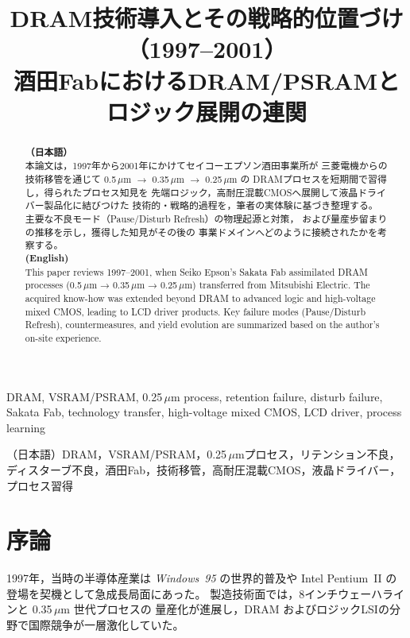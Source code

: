 \documentclass[conference]{IEEEtran}
\title{DRAM技術導入とその戦略的位置づけ（1997--2001）\\
\large 酒田FabにおけるDRAM/PSRAMとロジック展開の連関}
\author{%
  \IEEEauthorblockN{三溝 真一 (Shinichi Samizo)}%
  \IEEEauthorblockA{独立系半導体研究者（元セイコーエプソン）\\%
  Independent Semiconductor Researcher (ex-Seiko Epson)\\%
  Email: \href{mailto:shin3t72@gmail.com}{shin3t72@gmail.com}\\%
  GitHub: \url{https://github.com/Samizo-AITL}}%
}
\begin{document}
\maketitle

\begin{abstract}
\textbf{（日本語）}\\
本論文は，1997年から2001年にかけてセイコーエプソン酒田事業所が
三菱電機からの技術移管を通じて \mbox{0.5\,$\mu$m} $\rightarrow$ \mbox{0.35\,$\mu$m} $\rightarrow$ \mbox{0.25\,$\mu$m} の
DRAMプロセスを短期間で習得し，得られたプロセス知見を
先端ロジック，高耐圧混載CMOSへ展開して液晶ドライバー製品化に結びつけた
技術的・戦略的過程を，筆者の実体験に基づき整理する。
主要な不良モード（Pause/Disturb Refresh）の物理起源と対策，
および量産歩留まりの推移を示し，獲得した知見がその後の
事業ドメインへどのように接続されたかを考察する。\\[1ex]

\textbf{(English)}\\
This paper reviews 1997–2001, when Seiko Epson’s Sakata Fab
assimilated DRAM processes (0.5\,$\mu$m → 0.35\,$\mu$m → 0.25\,$\mu$m) transferred from Mitsubishi Electric.
The acquired know-how was extended beyond DRAM to advanced logic
and high-voltage mixed CMOS, leading to LCD driver products.
Key failure modes (Pause/Disturb Refresh), countermeasures, and yield evolution
are summarized based on the author’s on-site experience.
\end{abstract}

\begin{IEEEkeywords}
DRAM, VSRAM/PSRAM, 0.25\,$\mu$m process, retention failure, disturb failure, Sakata Fab, technology transfer, high-voltage mixed CMOS, LCD driver, process learning

\hspace{1em}（日本語）DRAM，VSRAM/PSRAM，0.25\,$\mu$mプロセス，リテンション不良，ディスターブ不良，酒田Fab，技術移管，高耐圧混載CMOS，液晶ドライバー，プロセス習得
\end{IEEEkeywords}

\section{序論}

1997年，当時の半導体産業は \textit{Windows~95} の世界的普及や
Intel Pentium~II の登場を契機として急成長局面にあった。
製造技術面では，8インチウェーハラインと 0.35\,$\mu$m 世代プロセスの
量産化が進展し，DRAM およびロジックLSIの分野で国際競争が一層激化していた。
\end{document}
